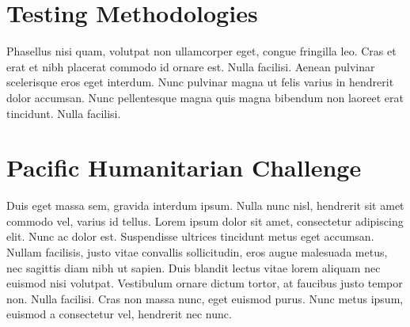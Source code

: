 \section{Testing Methodologies}

Phasellus nisi quam, volutpat non ullamcorper eget, congue fringilla leo. Cras et erat et nibh placerat commodo id ornare est. Nulla facilisi. Aenean pulvinar scelerisque eros eget interdum. Nunc pulvinar magna ut felis varius in hendrerit dolor accumsan. Nunc pellentesque magna quis magna bibendum non laoreet erat tincidunt. Nulla facilisi.

\section{Pacific Humanitarian Challenge}

Duis eget massa sem, gravida interdum ipsum. Nulla nunc nisl, hendrerit sit amet commodo vel, varius id tellus. Lorem ipsum dolor sit amet, consectetur adipiscing elit. Nunc ac dolor est. Suspendisse ultrices tincidunt metus eget accumsan. Nullam facilisis, justo vitae convallis sollicitudin, eros augue malesuada metus, nec sagittis diam nibh ut sapien. Duis blandit lectus vitae lorem aliquam nec euismod nisi volutpat. Vestibulum ornare dictum tortor, at faucibus justo tempor non. Nulla facilisi. Cras non massa nunc, eget euismod purus. Nunc metus ipsum, euismod a consectetur vel, hendrerit nec nunc.